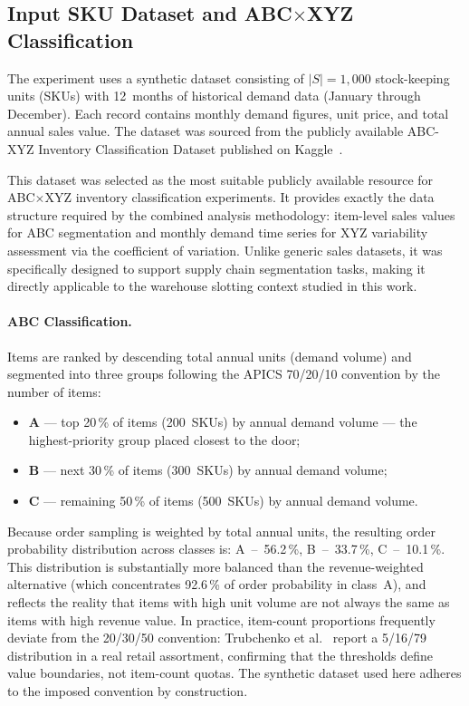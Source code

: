 \documentclass[12pt,a4paper]{article}
\begin{document}
\subsection{Input SKU Dataset and ABC$\times$XYZ Classification}

The experiment uses a synthetic dataset consisting of $|S| = 1{,}000$ stock-keeping units
(SKUs) with 12~months of historical demand data (January through December). Each record
contains monthly demand figures, unit price, and total annual sales value. The dataset
was sourced from the publicly available ABC-XYZ Inventory Classification Dataset
published on Kaggle~\cite{ref6}.

This dataset was selected as the most suitable publicly available resource for
ABC$\times$XYZ inventory classification experiments. It provides exactly the data
structure required by the combined analysis methodology: item-level sales values for
ABC segmentation and monthly demand time series for XYZ variability assessment via the
coefficient of variation. Unlike generic sales datasets, it was specifically designed
to support supply chain segmentation tasks, making it directly applicable to the
warehouse slotting context studied in this work.

\paragraph{ABC Classification.}
Items are ranked by descending total annual units (demand volume) and segmented into three
groups following the APICS 70/20/10 convention by the number of items:
\begin{itemize}
  \item \textbf{A} --- top 20\,\% of items (200~SKUs) by annual demand volume ---
    the highest-priority group placed closest to the door;
  \item \textbf{B} --- next 30\,\% of items (300~SKUs) by annual demand volume;
  \item \textbf{C} --- remaining 50\,\% of items (500~SKUs) by annual demand volume.
\end{itemize}
Because order sampling is weighted by total annual units, the resulting order
probability distribution across classes is: A~--~56.2\,\%, B~--~33.7\,\%, C~--~10.1\,\%.
This distribution is substantially more balanced than the revenue-weighted alternative
(which concentrates 92.6\,\% of order probability in class~A), and reflects the reality
that items with high unit volume are not always the same as items with high revenue value.
In practice, item-count proportions frequently deviate from the 20/30/50 convention:
Trubchenko et al.~\cite{ref1} report a 5/16/79 distribution in a real retail assortment,
confirming that the thresholds define value boundaries, not item-count quotas.
The synthetic dataset used here adheres to the imposed convention by construction.
\end{document}
